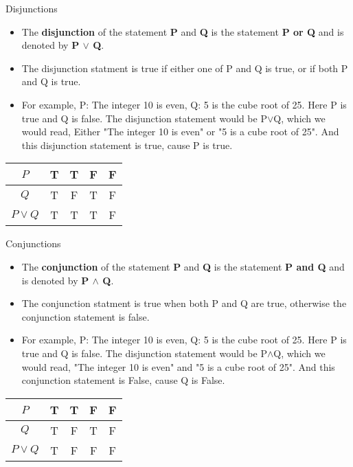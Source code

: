 \documentclass{beamer}
\begin{document}
\begin{frame}{Disjunctions}
    \begin{itemize}
    \item The \textbf{disjunction} of the statement \textbf{P} and \textbf{Q} is the statement \textbf{P or Q} and is denoted by \textbf{P $\lor$ Q}.
    \item The disjunction statment is true if either one of P and Q is true, or if both P and Q is true. 
    \item For example, P: The integer 10 is even, Q: 5 is the cube root of 25. Here P is true and Q is false. The disjunction statement would be P$\lor$Q, which we would read, Either "The integer 10 is even" or "5 is a cube root of 25". And this disjunction statement is true, cause P is true. 
    \end{itemize}
    \begin{center}
\begin{tabular}{|c|c|c|c|c|}
    \hline
    $P$ & T & T & F & F \\
    \hline
    $Q$ & T & F & T & F \\
    \hline
    $P \lor Q$ & T & T & T & F \\
    \hline
\end{tabular}
\end{center}
\end{frame}

\begin{frame}{Conjunctions}
    \begin{itemize}
    \item The \textbf{conjunction} of the statement \textbf{P} and \textbf{Q} is the statement \textbf{P and Q} and is denoted by \textbf{P $\land$ Q}.
    \item The conjunction statment is true when both P and Q are true, otherwise the conjunction statement is false.
    \item For example, P: The integer 10 is even, Q: 5 is the cube root of 25. Here P is true and Q is false. The disjunction statement would be P$\land$Q, which we would read, "The integer 10 is even" and "5 is a cube root of 25". And this conjunction statement is False, cause Q is False.
    \end{itemize}
    \begin{center}
\begin{tabular}{|c|c|c|c|c|}
    \hline
    $P$ & T & T & F & F \\
    \hline
    $Q$ & T & F & T & F \\
    \hline
    $P \lor Q$ & T & F & F & F \\
    \hline
\end{tabular}
\end{center}
\end{frame}
\end{document}
